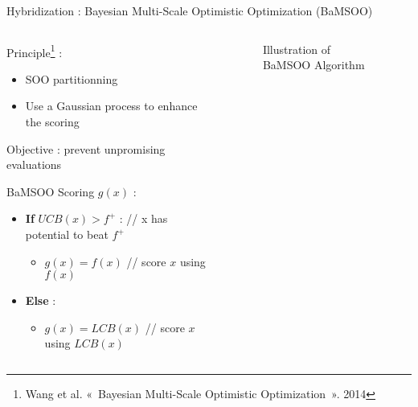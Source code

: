 \begin{frame}{Hybridization : Bayesian Multi-Scale Optimistic Optimization (BaMSOO)}
    \begin{columns}
        \begin{column}{0.55\textwidth}
            \begin{block}{Principle\footnote[7]{Wang et al. « Bayesian Multi-Scale Optimistic Optimization ». 2014} : }
                \begin{itemize}
                    \item SOO partitionning
                    \item Use a Gaussian process to enhance the scoring
                \end{itemize}
                Objective : prevent unpromising evaluations
                
            \end{block}
            
            \begin{block}{BaMSOO Scoring $g(x)$ :}
                \begin{itemize}
                    \item \textbf{If} $UCB(x) > f^+$ : {\color{gray} // \small x has potential to beat $f^+$}
                        \begin{itemize}
                            \item $g(x) = f(x)$ {\color{gray} // \small score $x$ using $f(x)$}
                        \end{itemize}
                    \item \textbf{Else } :
                        \begin{itemize}
                            \item $g(x) = LCB(x)$ {\color{gray} // \small score $x$ using $LCB(x)$}
                        \end{itemize}


                \end{itemize}
                
            \end{block}
            
        \end{column}        
        \begin{column}{0.45\textwidth}
            \begin{figure}[h]
                \centering
                
                \caption{Illustration of BaMSOO Algorithm}
            \end{figure}
        \end{column}
    \end{columns}
\end{frame}


